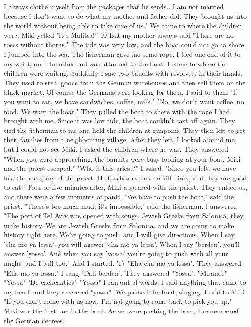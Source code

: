I always clothe myself from the packages that he sends.. I am not married 
because I don't want to do what my mother and father did.
They brought 
us into the world without being able to take care of us."
We came to where the children were.
Miki yelled "It's Malitsa!” 10 But 
my mother always said "There are no roses without thorns."
The tide was 
very low, and the boat could not go to shore.
I jumped into the sea.
The 
fisherman gave me some rope.
I tied one end of it to my wrist, and the 
other end was attached to the boat.
I came to where the children were 
waiting.
Suddenly I saw two bandits with revolvers in their hands.
They 
used to steal goods from the German warehouses and then sell them on the 
black market.
Of course the Germans were looking for them.
I said to 
them "If you want to eat, we have sandwiches, coffee, milk."
"No, we don't want coffee, no food.
We want the boat."
They pulled the boat to shore with the rope I had brought with me.
Since it was low tide, the boat couldn't cast off again.
They tied the fisherman to me and held the children 
at gunpoint.
They then left to get their families from a neighbouring 
village.
After they left, I looked around me, but I could not see Miki.
I 
asked the children where he was.
They answered "When you were approaching, the bandits were busy looking at your boat.
Miki and the priest escaped."
"Who is this priest?"
I asked.
"Since you left, we have had the company of the priest.
He teaches us how to kill birds, and they are 
good to eat."
Four or five minutes after, Miki appeared with the priest.
They untied us, and there were a few moments of panic.
"We have to push the boat," said the priest.
"There's too much mud, it's impossible," said the fisherman.
I answered "The port of Tel Aviv was opened with songs.
Jewish Greeks
from Salonica, they make history.
We are Jewish Greeks from Salonica, and 
we are going to make history right here.
We're going to push, and I will 
give directions.
When I say 'elia mo ya lessa', you will answer 'elia mo 
ya lessa'.
When I say 'berden', you'll answer 'yossa'.
And when you say 
'yossa' you're going to push with all your might, and I will too."
And 
I started.
'17 
"Elia elia mo ya lessa".
They answered "Elia mo ya lessa."
I sang "Dali berden".
They answered "Yossa".
"Mirande" 
"Yossa" 
"De cachcantica" 
"Yossa" 
I ran out of words.
I said anything that came to my head, and they 
answered "yossa".
We pushed the boat, singing.
I said to Miki "If you 
don't come with us now, I'm not going to come back to pick you up."
Miki 
was the first one in the boat.
As we were pushing the boat, I remembered the German decrees.
